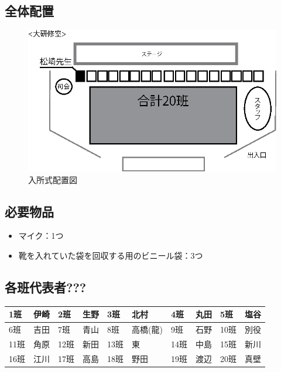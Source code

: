 \subsection{全体配置}
\begin{figure}[H]
  \begin{center}
  \includegraphics[scale=1.5]{./08/nyushoshiki.eps}
  \caption{入所式配置図}
  \label{nyusyosiki}
  \end{center}
\end{figure}


\subsection{必要物品}
\begin{itemize}
\item マイク：1つ
\item 靴を入れていた袋を回収する用のビニール袋：3つ
\end{itemize}

\clearpage

\subsection{各班代表者???}
\begin{table}[htb]
  \begin{center}
  \begin{tabular}{|l|l||l|l||l|l||l|l||l|l|} \hline
  1班 & 伊崎 & 2班 & 生野 & 3班 & 北村 & 4班 & 丸田 & 5班 & 塩谷 \\ \hline
  6班 & 吉田 & 7班 & 青山 & 8班 & 高橋(龍) & 9班 & 石野 & 10班 & 別役  \\  \hline
  11班 & 角原 & 12班 & 新田 & 13班 & 東 & 14班 & 中島 & 15班 & 新川 \\ \hline
  16班 & 江川 & 17班 & 高島 & 18班 & 野田 & 19班 & 渡辺 & 20班 & 真壁 \\ \hline
    \end{tabular}
  \end{center}
\end{table}


